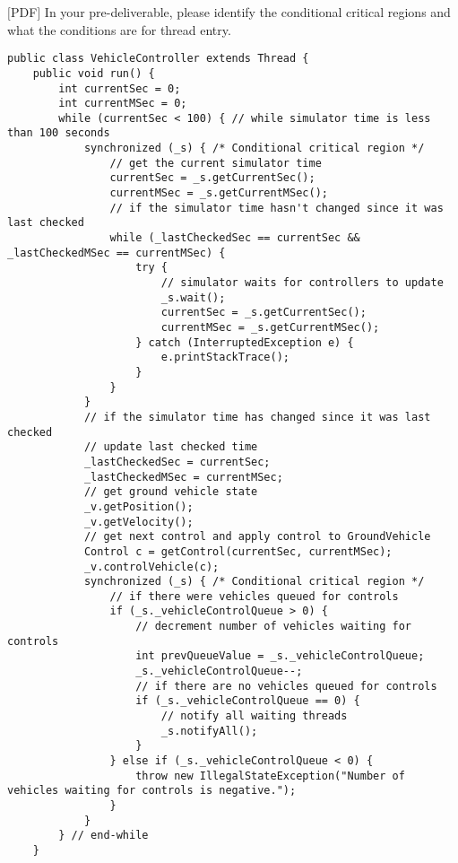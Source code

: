 \documentclass[12pt]{article}
\begin{document}
 $[$PDF$]$ In your pre-deliverable, please identify the conditional critical regions and what the conditions are for thread entry.\qe
\begin{lstlisting}
public class VehicleController extends Thread {
	public void run() {
        int currentSec = 0;
        int currentMSec = 0;
        while (currentSec < 100) { // while simulator time is less than 100 seconds
            synchronized (_s) { /* Conditional critical region */
                // get the current simulator time
                currentSec = _s.getCurrentSec();
                currentMSec = _s.getCurrentMSec();
                // if the simulator time hasn't changed since it was last checked
                while (_lastCheckedSec == currentSec && _lastCheckedMSec == currentMSec) {
                    try {
                        // simulator waits for controllers to update
                        _s.wait();
                        currentSec = _s.getCurrentSec();
                        currentMSec = _s.getCurrentMSec();
                    } catch (InterruptedException e) {
                        e.printStackTrace();
                    }
                }
            }
            // if the simulator time has changed since it was last checked
            // update last checked time
            _lastCheckedSec = currentSec;
            _lastCheckedMSec = currentMSec;
            // get ground vehicle state
            _v.getPosition();
            _v.getVelocity();
            // get next control and apply control to GroundVehicle
            Control c = getControl(currentSec, currentMSec);
            _v.controlVehicle(c);
            synchronized (_s) { /* Conditional critical region */
                // if there were vehicles queued for controls
                if (_s._vehicleControlQueue > 0) {
                    // decrement number of vehicles waiting for controls
                    int prevQueueValue = _s._vehicleControlQueue;
                    _s._vehicleControlQueue--;
                    // if there are no vehicles queued for controls
                    if (_s._vehicleControlQueue == 0) {
                        // notify all waiting threads
                        _s.notifyAll();
                    }
                } else if (_s._vehicleControlQueue < 0) {
                    throw new IllegalStateException("Number of vehicles waiting for controls is negative.");
                }
            }
        } // end-while
    }
\end{lstlisting}
\end{document}
